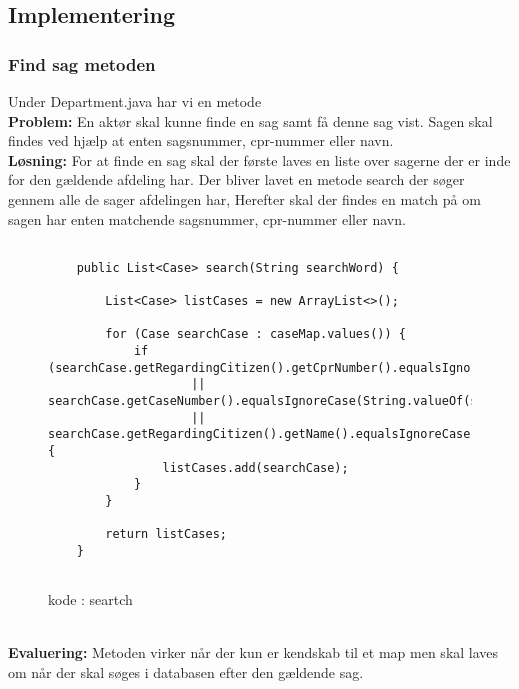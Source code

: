 \subsection{Implementering}



\subsubsection{Find sag metoden}
Under Department.java har vi en metode \\
\textbf{Problem: }
En aktør skal kunne finde en sag samt få denne sag vist. Sagen skal findes ved hjælp at enten sagsnummer, cpr-nummer eller navn. \\
\textbf{Løsning: }
For at finde en sag skal der første laves en liste over sagerne der er inde for den gældende afdeling har. 
Der bliver lavet en metode search der søger gennem alle de sager afdelingen har,
Herefter skal der findes en match på om sagen har enten matchende sagsnummer, cpr-nummer eller navn. 
\begin{figure}[h]
\begin{lstlisting}

    public List<Case> search(String searchWord) {

        List<Case> listCases = new ArrayList<>();

        for (Case searchCase : caseMap.values()) {
            if (searchCase.getRegardingCitizen().getCprNumber().equalsIgnoreCase(searchWord)
                    || searchCase.getCaseNumber().equalsIgnoreCase(String.valueOf(searchWord))
                    || searchCase.getRegardingCitizen().getName().equalsIgnoreCase(searchWord)) {
                listCases.add(searchCase);
            }
        }

        return listCases;
    }


\end{lstlisting}
\caption{kode : seartch}
\label{kode:Search}
\end{figure}\\
\textbf{Evaluering:}
Metoden virker når der kun er kendskab til et map men skal laves om når der skal søges i databasen efter den gældende sag.
